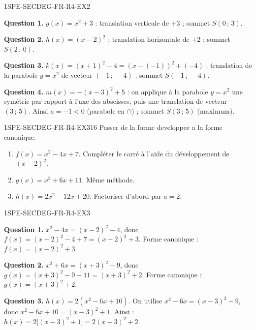 \begin{corrige}{1SPE-SECDEG-FR-R4-EX2}


\textbf{Question 1.} $g(x) = x^2 + 3$ : translation verticale de $+3$ ; sommet $S(0\,;\,3)$.

\textbf{Question 2.} $h(x) = (x-2)^2$ : translation horizontale de $+2$ ; sommet $S(2\,;\,0)$.

\textbf{Question 3.} $k(x) = (x+1)^2 - 4 = (x-(-1))^2 + (-4)$ :
translation de la parabole $y=x^2$ de vecteur $(-1\,;\,-4)$ ; sommet $S(-1\,;\,-4)$.

\textbf{Question 4.} $m(x) = -(x-3)^2 + 5$ : on applique à la parabole $y=x^2$
une symétrie par rapport à l'axe des abscisses, puis une translation de vecteur
$(3\,;\,5)$. Ainsi $a = -1 < 0$ (parabole en $\cap$) ; sommet $S(3\,;\,5)$ (maximum).

\end{corrige}


\begin{exercice}{1SPE-SECDEG-FR-R4-EX3}{1}{6}
Passer de la forme developpee a la forme canonique.
\begin{enumerate}
  \item $f(x) = x^2 - 4x + 7$. Compléter le carré à l'aide du développement de $(x-2)^2$.
  \item $g(x) = x^2 + 6x + 11$. Même méthode.
  \item $h(x) = 2x^2 - 12x + 20$. Factoriser d'abord par $a = 2$.
\end{enumerate}
\end{exercice}


\begin{corrige}{1SPE-SECDEG-FR-R4-EX3}

\textbf{Question 1.} $x^2-4x=(x-2)^2-4$, donc
$f(x)=(x-2)^2-4+7=(x-2)^2+3$.
Forme canonique : $f(x) = (x-2)^2 + 3$.

\textbf{Question 2.} $x^2+6x=(x+3)^2-9$, donc
$g(x)=(x+3)^2-9+11=(x+3)^2+2$.
Forme canonique : $g(x) = (x+3)^2 + 2$.


\textbf{Question 3.} $h(x) = 2(x^2 - 6x + 10)$.
On utilise $x^2-6x=(x-3)^2-9$, donc $x^2-6x+10=(x-3)^2+1$.
Ainsi : $h(x) = 2\bigl[(x-3)^2 + 1\bigr] = 2(x-3)^2 + 2$.

\end{corrige}

